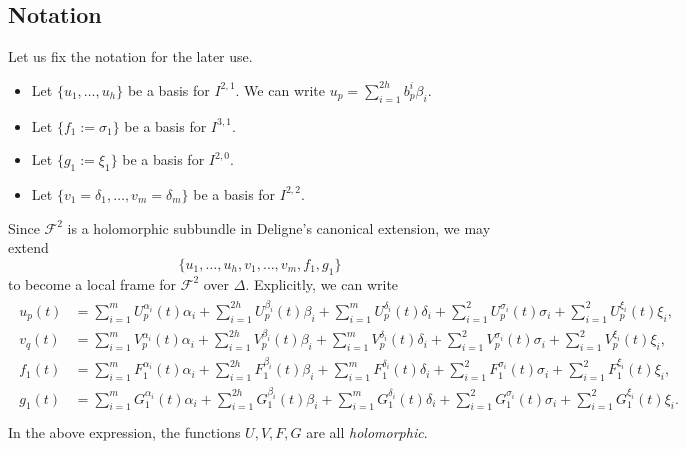 \subsection{Notation}
Let us fix the notation for the later use.
\begin{itemize}
\item Let \(\{u_{1},\ldots,u_{h}\}\) be
a basis for \(I^{2,1}\). We can
write \(u_{p}=\sum_{i=1}^{2h} b^{i}_{p} \beta_{i}\).
\item Let \(\{f_{1}:=\sigma_{1}\}\) be a basis for \(I^{3,1}\).
\item Let \(\{g_{1}:=\xi_{1}\}\) be a basis for \(I^{2,0}\).
\item Let \(\{v_{1}=\delta_{1},\ldots,v_{m}=\delta_{m}\}\) be a basis for \(I^{2,2}\). 
\end{itemize}
Since \(\mathcal{F}^{2}\) is a holomorphic subbundle in 
Deligne's canonical extension, we may extend
\begin{equation}
\{u_{1},\ldots,u_{h},v_{1},\ldots,v_{m},f_{1},g_{1}\}
\end{equation}
to become a local frame for \(\mathcal{F}^{2}\) over \(\Delta\). Explicitly, we can write
\begin{align*}
\begin{split}
u_{p}(t) &= \sum_{i=1}^{m} U^{\alpha_{i}}_{p}(t) \alpha_{i}+
\sum_{i=1}^{2h} U^{\beta_{i}}_{p}(t) \beta_{i} + \sum_{i=1}^{m} 
U^{\delta_{i}}_{p}(t) \delta_{i}+\sum_{i=1}^{2}
U^{\sigma_{i}}_{p}(t)\sigma_{i}+\sum_{i=1}^{2}U^{\xi_{i}}_{p}(t)\xi_{i},\\
v_{q}(t) &= \sum_{i=1}^{m} V^{\alpha_{i}}_{p}(t) \alpha_{i}+
\sum_{i=1}^{2h} V^{\beta_{i}}_{p}(t) \beta_{i} + \sum_{i=1}^{m} 
V^{\delta_{i}}_{p}(t) \delta_{i}+\sum_{i=1}^{2}
V^{\sigma_{i}}_{p}(t)\sigma_{i}+\sum_{i=1}^{2}V^{\xi_{i}}_{p}(t)\xi_{i},\\
f_{1}(t)&= \sum_{i=1}^{m} F^{\alpha_{i}}_{1}(t) \alpha_{i}+
\sum_{i=1}^{2h} F^{\beta_{i}}_{1}(t) \beta_{i} + \sum_{i=1}^{m} 
F^{\delta_{i}}_{1}(t) \delta_{i}+\sum_{i=1}^{2}
F^{\sigma_{i}}_{1}(t)\sigma_{i}+\sum_{i=1}^{2}F^{\xi_{i}}_{1}(t)\xi_{i},\\
g_{1}(t)&= \sum_{i=1}^{m} G^{\alpha_{i}}_{1}(t) \alpha_{i}+
\sum_{i=1}^{2h} G^{\beta_{i}}_{1}(t) \beta_{i} + \sum_{i=1}^{m} 
G^{\delta_{i}}_{1}(t) \delta_{i}+\sum_{i=1}^{2}
G^{\sigma_{i}}_{1}(t)\sigma_{i}+\sum_{i=1}^{2}G^{\xi_{i}}_{1}(t)\xi_{i}.\\
\end{split}
\end{align*}
In the above expression, the functions \(U,V,F,G\) are all \emph{holomorphic}.
